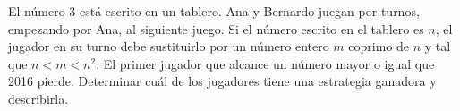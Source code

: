 El número $3$ está escrito en un tablero. Ana y Bernardo juegan por turnos, empezando por Ana, al siguiente juego. Si el número escrito en el tablero es $n$, el jugador en su turno debe sustituirlo por un número entero $m$ coprimo de $n$ y tal que $n\lt m\lt n^2$. El primer jugador que alcance un número mayor o igual que 2016 pierde. Determinar cuál de los jugadores tiene una estrategia ganadora y describirla.
